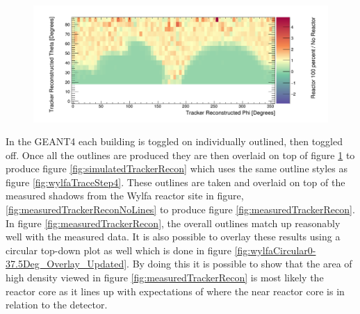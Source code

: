\begin{figure}[htbp]
 \centering
 \includegraphics[width=\linewidth]{Chapter5/Figs/wylfaRasterNew/simulatedTrackerReconNoLines.png}
 \label{fig:simulatedTrackerReconNoLines}
\end{figure}

In the GEANT4 each building is toggled on individually outlined, then toggled off. Once all the outlines are produced they are then overlaid on top of figure \ref{fig:simulatedTrackerReconNoLines} to produce figure \ref{fig:simulatedTrackerRecon} which uses the same outline styles as figure \ref{fig:wylfaTraceStep4}. These outlines are taken and overlaid on top of the measured shadows from the Wylfa reactor site in figure, \ref{fig:measuredTrackerReconNoLines} to produce figure \ref{fig:measuredTrackerRecon}. In figure \ref{fig:measuredTrackerRecon}, the overall outlines match up reasonably well with the measured data. It is also possible to overlay these results using a circular top-down plot as well which is done in figure \ref{fig:wylfaCircular0-37.5Deg_Overlay_Updated}. By doing this it is possible to show that the area of high density viewed in figure \ref{fig:measuredTrackerRecon} is most likely the reactor core as it lines up with expectations of where the near reactor core is in relation to the detector. 

